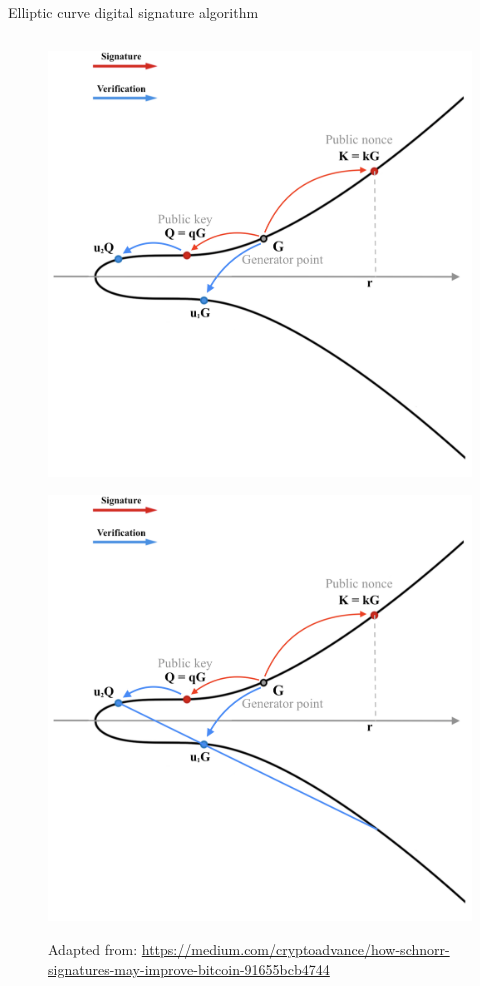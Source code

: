\documentclass[slidescentered]{beamer}
\newcommand{\source}[1]{\caption*{\tiny Adapted from: {#1}} }
\begin{document}
\begin{frame}{Elliptic curve digital signature algorithm}
\begin{columns}
\begin{column}{0.5\linewidth}
\begin{figure}
					 {\vspace*{-0.5cm}
						\hspace*{-1cm}
						\includegraphics[scale=0.29]{images/ECDSA5}
						\source{\tiny \url{https://medium.com/cryptoadvance/how-schnorr-signatures-may-improve-bitcoin-91655bcb4744}}}
					 {\vspace*{-0.5cm}
						\hspace*{-1cm}
						\includegraphics[scale=0.29]{images/ECDSA6}
}
\end{figure}
\end{column}
\end{columns}
\end{frame}
\end{document}
